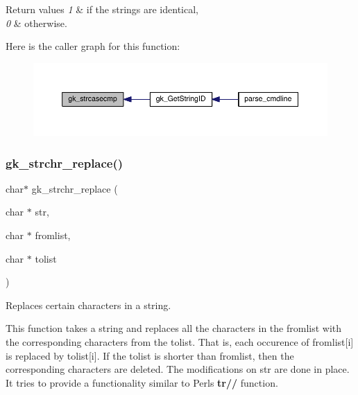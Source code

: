 \begin{DoxyRetVals}{Return values}
{\em 1} & if the strings are identical, \\
\hline
{\em 0} & otherwise. \\
\hline
\end{DoxyRetVals}
Here is the caller graph for this function\+:\nopagebreak
\begin{figure}[H]
\begin{center}
\leavevmode
\includegraphics[width=350pt]{a00077_a47570da67818e57e97fdd464bc60fbd1_icgraph}
\end{center}
\end{figure}
\mbox{\label{a00077_a29b909254dcbcae417f8c09ce21d5423}} 
\subsubsection{\texorpdfstring{gk\+\_\+strchr\+\_\+replace()}{gk\_strchr\_replace()}}
{\footnotesize\ttfamily char$\ast$ gk\+\_\+strchr\+\_\+replace (\begin{DoxyParamCaption}\item[{char $\ast$}]{str,  }\item[{char $\ast$}]{fromlist,  }\item[{char $\ast$}]{tolist }\end{DoxyParamCaption})}



Replaces certain characters in a string. 

This function takes a string and replaces all the characters in the {\ttfamily fromlist} with the corresponding characters from the {\ttfamily tolist}. That is, each occurence of {\ttfamily fromlist\mbox{[}i\mbox{]}} is replaced by {\ttfamily tolist\mbox{[}i\mbox{]}}. If the {\ttfamily tolist} is shorter than {\ttfamily fromlist}, then the corresponding characters are deleted. The modifications on {\ttfamily str} are done in place. It tries to provide a functionality similar to Perl\textquotesingle{}s {\bfseries tr//} function.


